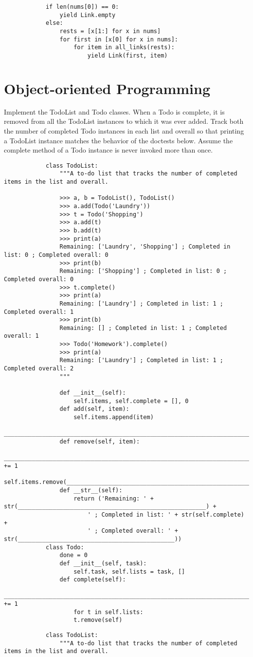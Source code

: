 \documentclass{exam}
\begin{document}
\begin{questions}
\begin{blocksection}
\begin{solution}
\begin{lstlisting}
			if len(nums[0]) == 0:
				yield Link.empty
			else:
				rests = [x[1:] for x in nums]
				for first in [x[0] for x in nums]:
					for item in all_links(rests):
						yield Link(first, item)
		\end{lstlisting}
	\end{solution}
\section{Object-oriented Programming}
	\begin{blocksection}
		Implement the TodoList and Todo classes. When a Todo is complete, it is removed from all the TodoList instances to which it was ever added. Track both the number of completed Todo instances in each list and overall so that printing a TodoList instance matches the behavior of the doctests below. Assume the complete method of a Todo instance is never invoked more than once.
		\begin{lstlisting}
			class TodoList:
				"""A to-do list that tracks the number of completed items in the list and overall.

				>>> a, b = TodoList(), TodoList()
				>>> a.add(Todo('Laundry'))
				>>> t = Todo('Shopping')
				>>> a.add(t)
				>>> b.add(t)
				>>> print(a)
				Remaining: ['Laundry', 'Shopping'] ; Completed in list: 0 ; Completed overall: 0
				>>> print(b)
				Remaining: ['Shopping'] ; Completed in list: 0 ; Completed overall: 0
				>>> t.complete()
				>>> print(a)
				Remaining: ['Laundry'] ; Completed in list: 1 ; Completed overall: 1
				>>> print(b)
				Remaining: [] ; Completed in list: 1 ; Completed overall: 1
				>>> Todo('Homework').complete()
				>>> print(a)
				Remaining: ['Laundry'] ; Completed in list: 1 ; Completed overall: 2
				"""
				
				def __init__(self):
					self.items, self.complete = [], 0
				def add(self, item):
					self.items.append(item)
					_____________________________________________________________________________________
				def remove(self, item):
					________________________________________________________________________________ += 1
					self.items.remove(___________________________________________________________________)
				def __str__(self):
					return ('Remaining: ' + str(______________________________________________________) + 
						' ; Completed in list: ' + str(self.complete) +
						' ; Completed overall: ' + str(_____________________________________________))
			class Todo:
				done = 0
				def __init__(self, task):
					self.task, self.lists = task, []
				def complete(self):
					________________________________________________________________________________ += 1
					for t in self.lists:
					t.remove(self)
		\end{lstlisting}
	\end{blocksection}
	\begin{solution}
		\begin{lstlisting}
			class TodoList:
				"""A to-do list that tracks the number of completed items in the list and overall.


\end{lstlisting}
\end{solution}
\end{blocksection}
\end{questions}
\end{document}
